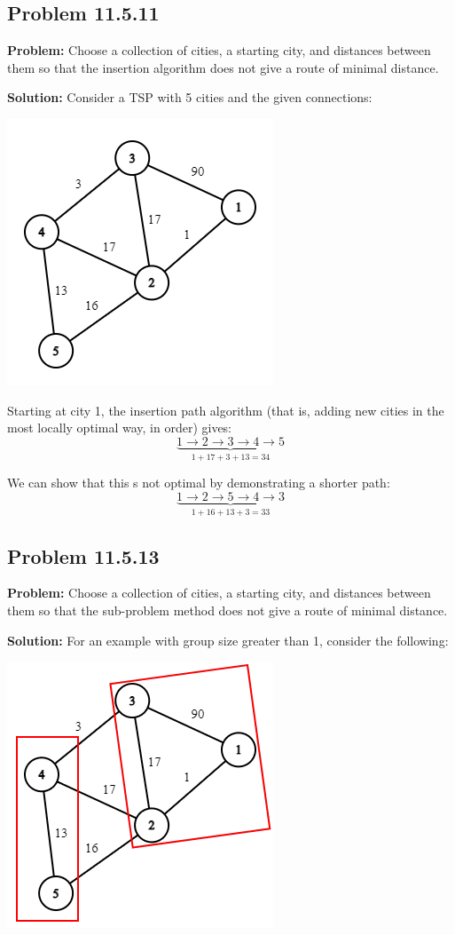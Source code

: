 \documentclass{article}
\begin{document}
\subsection*{Problem 11.5.11}
\noindent\textbf{Problem:} Choose a collection of cities, a starting city, and distances between them so that the insertion algorithm does not give a route of minimal distance.
\bigskip

\noindent\textbf{Solution:} Consider a TSP with 5 cities and the given connections:
\begin{center}
  \includegraphics[scale=.5]{graph2.png}
\end{center}

Starting at city 1, the insertion path algorithm (that is, adding new cities in the most locally optimal way, in order) gives:
$$\underbrace{1\to2\to3\to4\to5}_{1+17+3+13=34}$$

We can show that this s not optimal by demonstrating a shorter path:
$$\underbrace{1\to2\to5\to4\to3}_{1+16+13+3=33}$$

\subsection*{Problem 11.5.13}
\noindent\textbf{Problem:} Choose a collection of cities, a starting city, and distances between them so that the sub-problem method does not give a route of minimal distance.
\bigskip

\noindent\textbf{Solution:} For an example with group size greater than 1, consider the following:
\begin{center}
  \includegraphics[scale=.5]{graph3.png}
\end{center}
\end{document}
